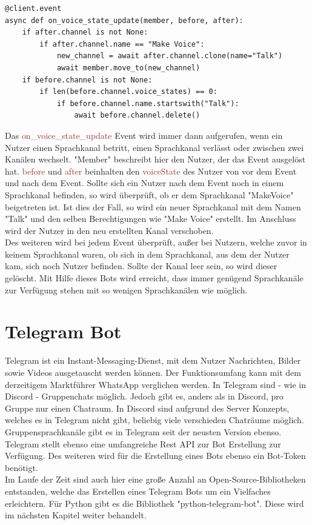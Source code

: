 \documentclass[sigplan,screen]{acmart}
\begin{document}
\begin{lstlisting}
@client.event
async def on_voice_state_update(member, before, after):
    if after.channel is not None:
        if after.channel.name == "Make Voice":
            new_channel = await after.channel.clone(name="Talk")
            await member.move_to(new_channel)
    if before.channel is not None:
        if len(before.channel.voice_states) == 0:
            if before.channel.name.startswith("Talk"):
                await before.channel.delete()
\end{lstlisting} 
Das \textcolor{brown}{on\_voice\_state\_update} Event wird immer dann aufgerufen, wenn ein Nutzer einen Sprachkanal betritt, einen Sprachkanal verlässt oder zwischen zwei Kanälen wechselt. "Member" beschreibt hier den Nutzer, der das Event ausgelöst hat. \textcolor{brown}{before} und \textcolor{brown}{after} beinhalten den \textcolor{brown}{voiceState} des Nutzer von vor dem Event und nach dem Event. Sollte sich ein Nutzer nach dem Event noch in einem Sprachkanal befinden, so wird überprüft, ob er dem Sprachkanal "MakeVoice" beigetreten ist. Ist dies der Fall, so wird ein neuer Sprachkanal mit dem Namen "Talk" und den selben Berechtigungen wie "Make Voice" erstellt. Im Anschluss wird der Nutzer in den neu erstellten Kanal verschoben. \\
\noindent Des weiteren wird bei jedem Event überprüft, außer bei Nutzern, welche zuvor in keinem Sprachkanal waren, ob sich in dem Sprachkanal, aus dem der Nutzer kam, sich noch Nutzer befinden. Sollte der Kanal leer sein, so wird dieser gelöscht. Mit Hilfe dieses Bots wird erreicht, dass immer genügend Sprachkanäle zur Verfügung stehen mit so wenigen Sprachkanälen wie möglich.


\section{Telegram Bot}


Telegram ist ein Instant-Messaging-Dienst, mit dem Nutzer Nachrichten, Bilder sowie Videos ausgetauscht werden können. Der Funktionsumfang kann mit dem derzeitigem Marktführer WhatsApp \cite{wa1} verglichen werden. In Telegram sind - wie in Discord - Gruppenchats möglich. Jedoch gibt es, anders als in Discord, pro Gruppe nur einen Chatraum. In Discord sind aufgrund des Server Konzepts, welches es in Telegram nicht gibt, beliebig viele verschieden Chaträume möglich. Gruppensprachkanäle gibt es in Telegram seit der neusten Version ebenso. \cite{tele0} \\
\noindent Telegram stellt ebenso eine umfangreiche Rest API zur Bot Erstellung zur Verfügung. Des weiteren wird für die Erstellung eines Bots ebenso ein Bot-Token benötigt. \cite{tele1} \\
\noindent Im Laufe der Zeit sind auch hier eine große Anzahl an Open-Source-Bibliotheken entstanden, welche das Erstellen eines Telegram Bots um ein Vielfaches erleichtern. Für Python gibt es die Bibliothek "python-telegram-bot". Diese wird im nächsten Kapitel weiter behandelt. \cite{tele3}
\end{document}
